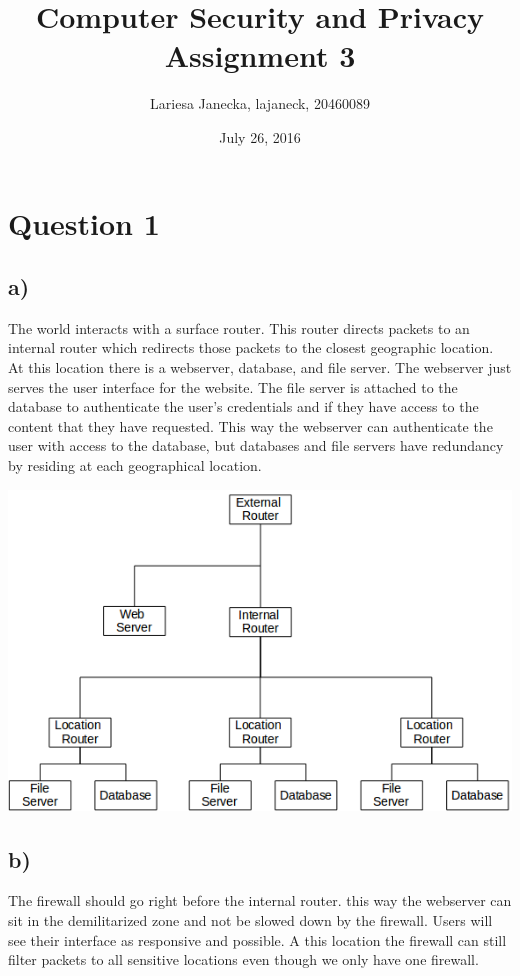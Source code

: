 \documentclass{article}
\begin{document}
\title{Computer Security and Privacy Assignment 3}
\date{July 26, 2016}
\author{Lariesa Janecka, lajaneck, 20460089}
\maketitle


\section{Question 1} %
\label{sec:question_1}
\subsection{a)} %
\label{sub:a_}
The world interacts with a surface router. This router directs packets  to an internal router which redirects those packets to the closest geographic location. At this location there is a webserver, database, and file server. The webserver just serves the user interface for the website. The file server is attached to the database to authenticate the user's credentials and if they have access to the content that they have requested. This way the webserver can authenticate the user with access to the database, but databases and file servers have redundancy by residing at each geographical location.

\includegraphics[scale=0.8]{network}

\subsection{b)} %
\label{sub:b_}
The firewall should go right before the internal router. this way the webserver can sit in the demilitarized zone and not be slowed down by the firewall. Users will see their interface as responsive and possible. A this location the firewall can still filter packets to all sensitive locations even though we only have one firewall.
\end{document}
